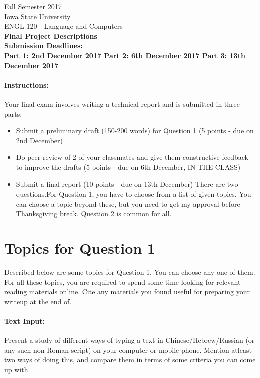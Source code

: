 \documentclass[11pt,a4paper]{article}
\begin{document}
\begin{center}
  Fall Semester 2017 \\ Iowa State University\\[3ex]
  {\large ENGL 120 - Language and Computers}\\[3ex]
  \textbf{Final Project Descriptions} \\ \textbf{Submission Deadlines: \\
  Part 1: 2nd December 2017
  Part 2: 6th December 2017
  Part 3: 13th December 2017}
\end{center}

\paragraph{Instructions:} Your final exam involves writing a technical report and is submitted in three parts:
\begin{itemize}
\item Submit a preliminary draft (150-200 words) for Question 1 (5 points - due on 2nd December)
\item Do peer-review of 2 of your classmates and give them constructive feedback to improve the drafts (5 points - due on 6th December, IN THE CLASS)
\item Submit a final report (10 points - due on 13th December)
There are two questions.For Question 1, you have to choose from a list of given topics. You can choose a topic beyond these, but you need to get my approval before Thanksgiving break. Question 2 is common for all. 
\end{itemize}

\section{Topics for Question 1}
Described below are some topics for Question 1. You can choose any one of them. For all these topics, you are required to spend some time looking for relevant reading materials online. Cite any materials you found useful for preparing your writeup at the end of.

\paragraph{Text Input: } Present a study of different ways of typing a text in Chinese/Hebrew/Russian (or any such non-Roman script) on your computer or mobile phone. Mention atleast two ways of doing this, and compare them in terms of some criteria you can come up with. 
\end{document}
